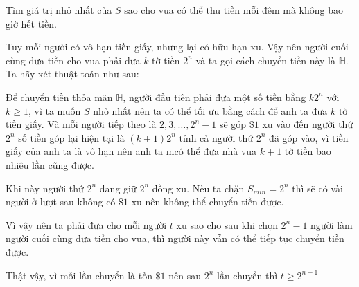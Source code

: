 \documentclass[11pt]{scrartcl}
\begin{document}
\begin{itemize}[label=, leftmargin=0em, itemsep=0.5em]
\begin{bt}
        Tìm giá trị nhỏ nhất của $S$ sao cho vua có thể thu tiền mỗi đêm mà không bao giờ hết tiền.
    \end{bt}

    \begin{sol}
        Tuy mỗi người có vô hạn tiền giấy, nhưng lại có hữu hạn xu. Vậy nên người cuối cùng đưa tiền cho vua phải đưa $k$ tờ tiền $2^n$ và ta gọi cách chuyển tiền này là $\mathbb{H}$. Ta hãy xét thuật toán như sau:

        Để chuyển tiền thỏa mãn $\mathbb{H}$, người đầu tiên phải đưa một số tiền bằng $k2^n$ với $k \geq 1$, vì ta muốn $S$ nhỏ nhất nên ta có thể tối ưu bằng cách để anh ta đưa $k$ tờ tiền giấy. Và mỗi người tiếp theo là $2,3,\dots,2^{n} - 1$ sẽ góp $\$1$ xu vào đến người thứ $2^n$ số tiền góp lại hiện tại là $(k + 1)2^n$ tính cả người thứ $2^n$ đã góp vào, vì tiền giấy của anh ta là vô hạn nên anh ta mcó thể đưa nhà vua $k + 1$ tờ tiền bao nhiêu lần cũng được.


        Khi này người thứ $2^n$ đang giữ $2^n$ đồng xu. Nếu ta chặn $S_{min} = 2^n$ thì sẽ có vài người ở lượt sau không có $\$1$ xu nên không thể chuyển tiền được.


        Vì vậy nên ta phải đưa cho mỗi người $t$ xu sao cho sau khi chọn $2^{n} - 1$ người làm người cuối cùng đưa tiền cho vua, thì người này vẫn có thể tiếp tục chuyển tiền được.


        Thật vậy, vì mỗi lần chuyển là tốn $\$1$ nên sau $2^{n}$ lần chuyển thì $t \geq 2^{n - 1}$



\end{sol}
\end{itemize}
\end{document}
